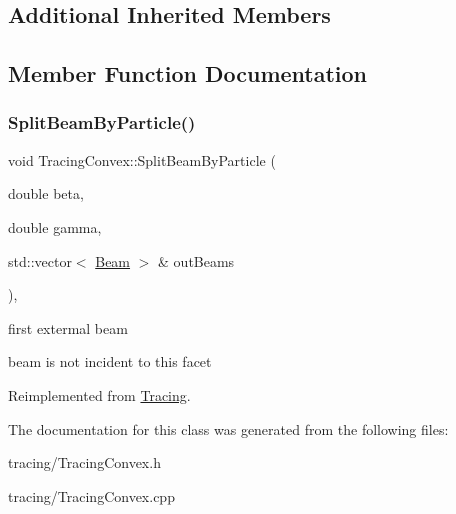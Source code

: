 \subsection*{Additional Inherited Members}


\subsection{Member Function Documentation}
\mbox{\label{class_tracing_convex_a6af4ffe46712b46b5472a7d7c930fb04}} 
\subsubsection{\texorpdfstring{Split\+Beam\+By\+Particle()}{SplitBeamByParticle()}}
{\footnotesize\ttfamily void Tracing\+Convex\+::\+Split\+Beam\+By\+Particle (\begin{DoxyParamCaption}\item[{double}]{beta,  }\item[{double}]{gamma,  }\item[{std\+::vector$<$ \mbox{\hyperlink{class_beam}{Beam}} $>$ \&}]{out\+Beams }\end{DoxyParamCaption})\hspace{0.3cm}{\ttfamily [override]}, {\ttfamily [virtual]}}

first extermal beam

beam is not incident to this facet 

Reimplemented from \mbox{\hyperlink{class_tracing}{Tracing}}.



The documentation for this class was generated from the following files\+:\begin{DoxyCompactItemize}
\item 
tracing/Tracing\+Convex.\+h\item 
tracing/Tracing\+Convex.\+cpp\end{DoxyCompactItemize}
